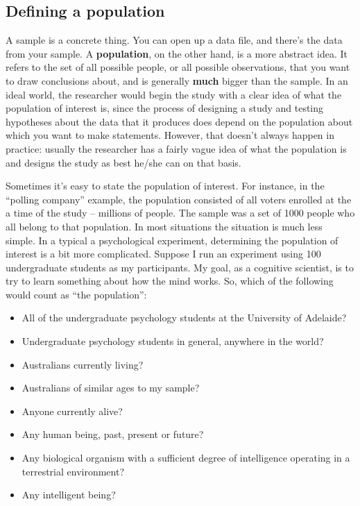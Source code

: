 \documentclass[
  letterpaper,
  DIV=11,
  numbers=noendperiod]{scrreprt}
\begin{document}
\subsection{Defining a population}\label{defining-a-population}

A sample is a concrete thing. You can open up a data file, and there's
the data from your sample. A \textbf{population}, on the other hand, is
a more abstract idea. It refers to the set of all possible people, or
all possible observations, that you want to draw conclusions about, and
is generally \textbf{much} bigger than the sample. In an ideal world,
the researcher would begin the study with a clear idea of what the
population of interest is, since the process of designing a study and
testing hypotheses about the data that it produces does depend on the
population about which you want to make statements. However, that
doesn't always happen in practice: usually the researcher has a fairly
vague idea of what the population is and designs the study as best
he/she can on that basis.

Sometimes it's easy to state the population of interest. For instance,
in the ``polling company'' example, the population consisted of all
voters enrolled at the a time of the study -- millions of people. The
sample was a set of 1000 people who all belong to that population. In
most situations the situation is much less simple. In a typical a
psychological experiment, determining the population of interest is a
bit more complicated. Suppose I run an experiment using 100
undergraduate students as my participants. My goal, as a cognitive
scientist, is to try to learn something about how the mind works. So,
which of the following would count as ``the population'':

\begin{itemize}
\item
  All of the undergraduate psychology students at the University of
  Adelaide?
\item
  Undergraduate psychology students in general, anywhere in the world?
\item
  Australians currently living?
\item
  Australians of similar ages to my sample?
\item
  Anyone currently alive?
\item
  Any human being, past, present or future?
\item
  Any biological organism with a sufficient degree of intelligence
  operating in a terrestrial environment?
\item
  Any intelligent being?
\end{itemize}
\end{document}
